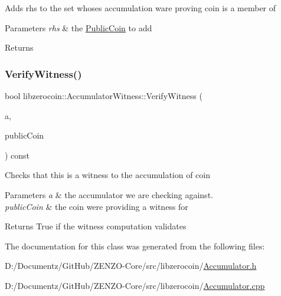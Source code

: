 Adds rhs to the set whose\textquotesingle{}s accumulation ware proving coin is a member of 
\begin{DoxyParams}{Parameters}
{\em rhs} & the \mbox{\hyperlink{classlibzerocoin_1_1_public_coin}{Public\+Coin}} to add \\
\hline
\end{DoxyParams}
\begin{DoxyReturn}{Returns}

\end{DoxyReturn}
\mbox{\label{classlibzerocoin_1_1_accumulator_witness_a76ce479fd510ed04d78c821cdb2a37bd}} 
\subsubsection{\texorpdfstring{VerifyWitness()}{VerifyWitness()}}
{\footnotesize\ttfamily bool libzerocoin\+::\+Accumulator\+Witness\+::\+Verify\+Witness (\begin{DoxyParamCaption}\item[{const \mbox{\hyperlink{classlibzerocoin_1_1_accumulator}{Accumulator}} \&}]{a,  }\item[{const \mbox{\hyperlink{classlibzerocoin_1_1_public_coin}{Public\+Coin}} \&}]{public\+Coin }\end{DoxyParamCaption}) const}

Checks that this is a witness to the accumulation of coin 
\begin{DoxyParams}{Parameters}
{\em a} & the accumulator we are checking against. \\
\hline
{\em public\+Coin} & the coin we\textquotesingle{}re providing a witness for \\
\hline
\end{DoxyParams}
\begin{DoxyReturn}{Returns}
True if the witness computation validates 
\end{DoxyReturn}


The documentation for this class was generated from the following files\+:\begin{DoxyCompactItemize}
\item 
D\+:/\+Documentz/\+Git\+Hub/\+Z\+E\+N\+Z\+O-\/\+Core/src/libzerocoin/\mbox{\hyperlink{_accumulator_8h}{Accumulator.\+h}}\item 
D\+:/\+Documentz/\+Git\+Hub/\+Z\+E\+N\+Z\+O-\/\+Core/src/libzerocoin/\mbox{\hyperlink{_accumulator_8cpp}{Accumulator.\+cpp}}\end{DoxyCompactItemize}

